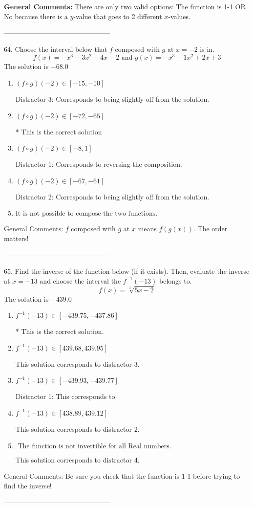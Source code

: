 \documentclass{extbook}[14pt]
\begin{document}
\textbf{General Comments:} There are only two valid options: The function is 1-1 OR No because there is a $y$-value that goes to 2 different $x$-values.

-----------------------------------------------

64. Choose the interval below that $f$ composed with $g$ at $x=-2$ is in.
\[ f(x) = -x^{3} -3 x^{2} -4 x -2 \text{ and } g(x) = -x^{3} -1 x^{2} +2 x + 3 \] 
The solution is $ -68.0 $ 

\begin{enumerate}[label=\Alph*.] 
\item $ (f \circ g)(-2) \in [-15, -10] $ 

  Distractor 3: Corresponds to being slightly off from the solution. 
\item $ (f \circ g)(-2) \in [-72, -65] $ 

 * This is the correct solution 
\item $ (f \circ g)(-2) \in [-8, 1] $ 

  Distractor 1: Corresponds to reversing the composition. 
\item $ (f \circ g)(-2) \in [-67, -61] $ 

  Distractor 2: Corresponds to being slightly off from the solution. 
\item $ \text{It is not possible to compose the two functions.} $ 

  
\end{enumerate} 
 
General Comments: $f$ composed with $g$ at $x$ means $f(g(x))$. The order matters!

-----------------------------------------------

65. Find the inverse of the function below (if it exists). Then, evaluate the inverse at $x = -13$ and choose the interval the $f^{-1}(-13)$ belongs to.
\[ f(x) = \sqrt[3]{5 x - 2} \] 
The solution is $ -439.0 $ 

\begin{enumerate}[label=\Alph*.] 
\item $ f^{-1}(-13) \in [-439.75, -437.86] $ 

 * This is the correct solution. 
\item $ f^{-1}(-13) \in [439.68, 439.95] $ 

  This solution corresponds to distractor 3. 
\item $ f^{-1}(-13) \in [-439.93, -439.77] $ 

  Distractor 1: This corresponds to  
\item $ f^{-1}(-13) \in [438.89, 439.12] $ 

  This solution corresponds to distractor 2. 
\item $ \text{ The function is not invertible for all Real numbers. } $ 

  This solution corresponds to distractor 4. 
\end{enumerate} 
 
General Comments: Be sure you check that the function is 1-1 before trying to find the inverse!

-----------------------------------------------
\end{document}
